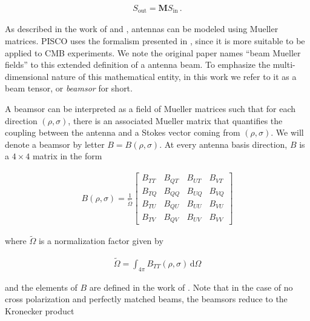 \documentclass[a4paper,11pt]{article}
\begin{document}
\begin{equation}
\begin{aligned}
S_{\mathrm{out}} = \mathbf{M} S_{\mathrm{in}} \, .
\end{aligned}
\end{equation}

\noindent
As described in the work of \cite{piepmeier_long_njoku_2008} and \cite{2007MNRAS.376.1767O}, antennas can be modeled using Mueller matrices. PISCO uses the formalism presented in \cite{2007MNRAS.376.1767O}, since it is more suitable to be applied to CMB experiments. We note the original paper names ``beam Mueller fields'' to this extended definition of a antenna beam. To emphasize the multi-dimensional nature of this mathematical entity, in this work we refer to it as a beam tensor, or \textsl{beamsor} for short.

A beamsor can be interpreted as a field of Mueller matrices such that for each direction $(\rho,\sigma)$, there is an associated Mueller matrix that quantifies the coupling between the antenna and a Stokes vector coming from $(\rho,\sigma)$. We will denote a beamsor by letter $B = B(\rho,\sigma)$. At every antenna basis direction, $B$ is a $4\times4$ matrix in the form

\begin{equation}
\begin{aligned}
B(\rho,\sigma) = \frac{1}{\tilde{\Omega}}
\begin{bmatrix}
B_{TT} & B_{QT} & B_{UT} & B_{VT}\\
B_{TQ} & B_{QQ} & B_{UQ} & B_{VQ}\\
B_{TU} & B_{QU} & B_{UU} & B_{VU}\\
B_{TV} & B_{QV} & B_{UV} & B_{VV}
\end{bmatrix}
\end{aligned}
\label{eq::beamsor}
\end{equation}

\noindent
where $\tilde{\Omega}$ is a normalization factor given by

\begin{equation}
\begin{aligned}
\tilde{\Omega} = \int_{4\pi} B_{TT}(\rho,\sigma) \, \mathrm{d} \Omega
\end{aligned}
\end{equation}

\noindent
and the elements of $B$ are defined in the work of \cite{2007MNRAS.376.1767O}. Note that in the case of no cross polarization and perfectly matched beams, the beamsors reduce to the Kronecker product 
\end{document}
